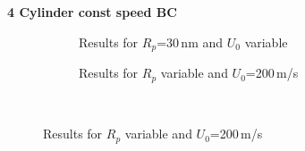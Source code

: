 \textbf{4 Cylinder const speed BC}
\begin{figure}[H]
            \begin{subfigure}{0.49\textwidth}
                  \flushleft
                 \caption{Results for $R_{p}$=30\,nm and $U_{0}$ variable}\label{subfig:fw_constBC_U0_var}
          \end{subfigure}\hfill
        \begin{subfigure}{0.49\textwidth}
                \flushright
                 \caption{Results for $R_{p}$ variable and $U_{0}$=200\,\textmu m/s}\label{subfig:fw_constBC_Rp_var}
        \end{subfigure}
        \\
        

\end{figure}

